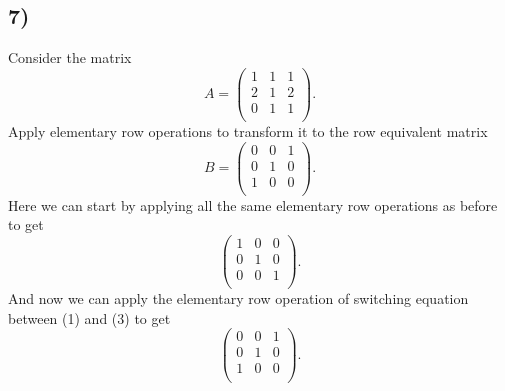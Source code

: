 \subsection*{7)}
Consider the matrix
\[ 
A = \begin{pmatrix}
1 & 1 & 1\\
2 & 1 & 2\\
0 & 1 & 1\\
\end{pmatrix}
.\]
Apply elementary row operations to transform it to the row equivalent matrix
\[ 
B = \begin{pmatrix}
0 & 0 & 1\\
0 & 1 & 0\\
1 & 0 & 0\\
\end{pmatrix}
.\]
\bigbreak
Here we can start by applying all the same elementary row operations as before to get
\[ 
\begin{pmatrix}
1 & 0 & 0\\
0 & 1 & 0\\
0 & 0 & 1\\
\end{pmatrix}
.\]
And now we can apply the elementary row operation of switching equation between (1) and (3) to get
\[ 
\begin{pmatrix}
0 & 0 & 1\\
0 & 1 & 0\\
1 & 0 & 0\\
\end{pmatrix}
.\]
